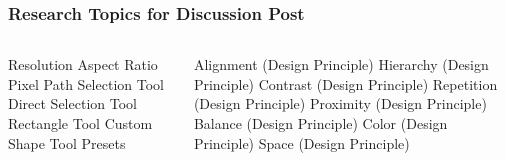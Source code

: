 \documentclass{beamer}
\begin{document}
				\begin{frame}
					\frametitle{Research Topics for Discussion Post}
					\begin{columns}
						\begin{outline}
							\1 Resolution
							\1 Aspect Ratio
							\1 Pixel
							\1 Path Selection Tool
							\1 Direct Selection Tool
							\1 Rectangle Tool
							\1 Custom Shape Tool
							\1 Presets
						\end{outline}
						\column{.5\textwidth}
					\begin{outline}
						\1 Alignment  (Design Principle)
						\1 Hierarchy  (Design Principle)
						\1 Contrast   (Design Principle)
						\1 Repetition (Design Principle)
						\1 Proximity  (Design Principle)
						\1 Balance    (Design Principle)
						\1 Color      (Design Principle)
						\1 Space      (Design Principle)
					\end{outline}
					\end{columns}
				\end{frame}
	
	\section{}	
\end{document}
